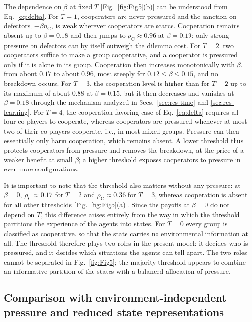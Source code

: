 \documentclass[%
  aip,cha,
  amsmath,amssymb,
  reprint,
  article-title,
]{revtex4-2}
\begin{document}
The dependence on $\beta$ at fixed $T$ [Fig.~\ref{fig:Fig5}(b)] can be understood from Eq.~\eqref{eq:delta}. For $T=1$, cooperators are never pressured and the sanction on defectors, $-\beta n_{\mathrm{C}}$, is weak wherever cooperators are scarce. Cooperation remains absent up to $\beta=0.18$ and then jumps to $\rho_{\mathrm{C}}\approx0.96$ at $\beta=0.19$: only strong pressure on defectors can by itself outweigh the dilemma cost. For $T=2$, two cooperators suffice to make a group cooperative, and a cooperator is pressured only if it is alone in its group. Cooperation then increases monotonically with $\beta$, from about $0.17$ to about $0.96$, most steeply for $0.12\leq\beta\leq0.15$, and no breakdown occurs. For $T=3$, the cooperation level is higher than for $T=2$ up to its maximum of about $0.88$ at $\beta=0.15$, but it then decreases and vanishes at $\beta=0.18$ through the mechanism analyzed in Secs.~\ref{sec:res-time} and \ref{sec:res-learning}. For $T=4$, the cooperation-favoring case of Eq.~\eqref{eq:delta} requires all four co-players to cooperate, whereas cooperators are pressured whenever at most two of their co-players cooperate, i.e., in most mixed groups. Pressure can then essentially only harm cooperation, which remains absent. A lower threshold thus protects cooperators from pressure and removes the breakdown, at the price of a weaker benefit at small $\beta$; a higher threshold exposes cooperators to pressure in ever more configurations.

It is important to note that the threshold also matters without any pressure: at $\beta=0$, $\rho_{\mathrm{C}}\approx0.17$ for $T=2$ and $\rho_{\mathrm{C}}\approx0.36$ for $T=3$, whereas cooperation is absent for all other thresholds [Fig.~\ref{fig:Fig5}(a)]. Since the payoffs at $\beta=0$ do not depend on $T$, this difference arises entirely from the way in which the threshold partitions the experience of the agents into states. For $T=0$ every group is classified as cooperative, so that the state carries no environmental information at all. The threshold therefore plays two roles in the present model: it decides who is pressured, and it decides which situations the agents can tell apart. The two roles cannot be separated in Fig.~\ref{fig:Fig5}; the majority threshold appears to combine an informative partition of the states with a balanced allocation of pressure.

\subsection{Comparison with environment-independent pressure and reduced state representations}\label{sec:res-comparison}
\end{document}
